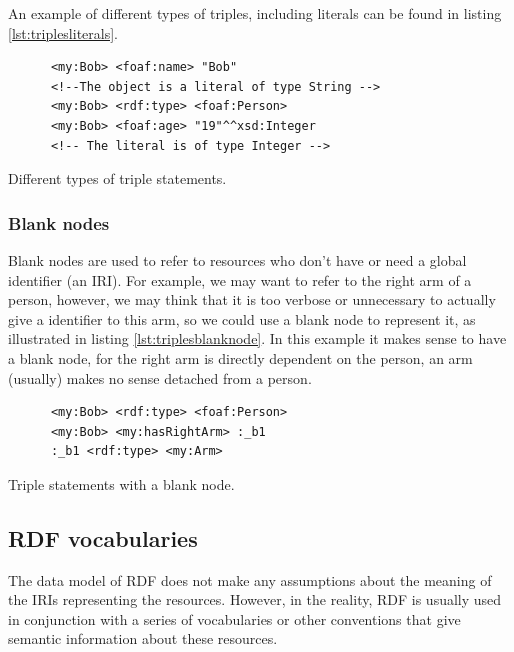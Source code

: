 An example of different types of triples, including literals can be found in listing \ref{lst:triplesliterals}.

\begin{listing}[ht]\centering
  \begin{minipage}{.6\textwidth}
    \begin{verbatim}
      <my:Bob> <foaf:name> "Bob"
      <!--The object is a literal of type String -->
      <my:Bob> <rdf:type> <foaf:Person> 
      <my:Bob> <foaf:age> "19"^^xsd:Integer 
      <!-- The literal is of type Integer -->
    \end{verbatim}
  \end{minipage}
  \caption{Different types of triple statements.}\label{lst:triplesliterals}
\end{listing}

\subsubsection*{Blank nodes}

Blank nodes are used to refer to resources who don't have or need a global identifier (an IRI). For example, we may want to refer to the right arm of a person, however, we may think that it is too verbose or unnecessary to actually give a identifier to this arm, so we could use a blank node to represent it, as illustrated in listing \ref{lst:triplesblanknode}. In this example it makes sense to have a blank node, for the right arm is directly dependent on the person, an arm (usually) makes no sense detached from a person.

\begin{listing}[ht]\centering
  \begin{minipage}{.6\textwidth}
    \begin{verbatim}
      <my:Bob> <rdf:type> <foaf:Person> 
      <my:Bob> <my:hasRightArm> :_b1
      :_b1 <rdf:type> <my:Arm>
    \end{verbatim}
  \end{minipage}
  \caption{Triple statements with a blank node.}\label{lst:triplesblanknode}
\end{listing}

\subsection*{RDF vocabularies}\label{ssec:rdfvocabularies}

The data model of RDF does not make any assumptions about the meaning of the IRIs representing the resources. However, in the reality, RDF is usually used in conjunction with a series of vocabularies or other conventions that give semantic information about these resources.

